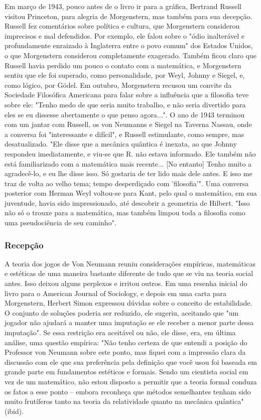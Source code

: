 \documentclass[a4paper,12pt]{article}[abntex2]
\begin{document}
Em março de 1943, pouco antes de o livro ir para a gráfica, Bertrand Russell visitou Princeton, para alegria de Morgenstern, mas também para sua decepção. Russell fez comentários sobre política e cultura, que Morgenstern considerou imprecisos e mal defendidos. Por exemplo, ele falou sobre o "ódio inalterável e profundamente enraizado à Inglaterra entre o povo comum" dos Estados Unidos, o que Morgenstern considerou completamente exagerado. Também ficou claro que Russell havia perdido um pouco o contato com a matemática, e Morgenstern sentiu que ele foi superado, como personalidade, por Weyl, Johnny e Siegel, e, como lógico, por Gödel. Em outubro, Morgenstern recusou um convite da Sociedade Filosófica Americana para falar sobre a influência que a filosofia teve sobre ele: "Tenho medo de que seria muito trabalho, e não seria divertido para eles se eu dissesse abertamente o que penso agora...". O ano de 1943 terminou com um jantar com Russell, os von Neumanns e Siegel na Taverna Nassau, onde a conversa foi "interessante e difícil", e Russell estimulante, como sempre, mas desatualizado. "Ele disse que a mecânica quântica é inexata, ao que Johnny respondeu imediatamente, e viu-se que R. não estava informado. Ele também não está familiarizado com a matemática mais recente... [No entanto] Tenho muito a agradecê-lo, e eu lhe disse isso. Só gostaria de ter lido mais dele antes. E isso me traz de volta ao velho tema; tempo desperdiçado com 'filosofia'". Uma conversa posterior com Herman Weyl voltou-se para Kant, pelo qual o matemático, em sua juventude, havia sido impressionado, até descobrir a geometria de Hilbert. "Isso não só o trouxe para a matemática, mas também limpou toda a filosofia como uma pseudociência de seu caminho".

\subsubsection{\textbf{Recepção}}
A teoria dos jogos de Von Neumann reuniu considerações empíricas, matemáticas e estéticas de uma maneira bastante diferente de tudo que se viu na teoria social antes. Isso deixou alguns perplexos e irritou outros. Em uma resenha inicial do livro para o American Journal of Sociology, e depois em uma carta para Morgenstern, Herbert Simon expressou dúvidas sobre o conceito de estabilidade. O conjunto de soluções poderia ser reduzido, ele sugeriu, aceitando que "um jogador não ajudará a manter uma imputação se ele receber a menor parte dessa imputação". Se essa restrição era aceitável ou não, ele disse, era, em última análise, uma questão empírica: "Não tenho certeza de que entendi a posição do Professor von Neumann sobre este ponto, mas fiquei com a impressão clara da discussão com ele que sua preferência pela definição que você usou foi baseada em grande parte em fundamentos estéticos e formais. Sendo um cientista social em vez de um matemático, não estou disposto a permitir que a teoria formal conduza os fatos a esse ponto – embora reconheça que métodos semelhantes tenham sido muito frutíferos tanto na teoria da relatividade quanto na mecânica quântica" (ibid).
\end{document}
